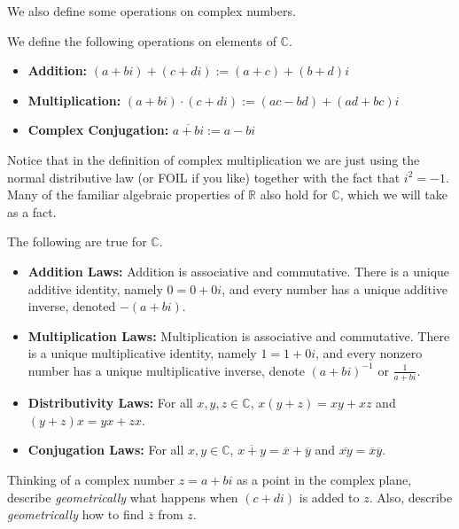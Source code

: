We also define some operations on complex numbers.

\begin{definition}
We define the following operations on elements of $\mathbb{C}$. 
\begin{itemize}
\item \textbf{Addition:} $(a+bi) + (c+di) := (a+c) + (b+d)i$
\item \textbf{Multiplication:} $(a+bi) \cdot (c+di) := (ac-bd) + (ad+bc)i$
\item \textbf{Complex Conjugation:} $\overline{a+bi} := a-bi$
\end{itemize}
\end{definition}

Notice that in the definition of complex multiplication we are just using the normal distributive law (or FOIL if you like) together with the fact that $i^2 = -1$. Many of the familiar algebraic properties of $\mathbb{R}$ also hold for $\mathbb{C}$, which we will take as a fact.

\begin{fact}\label{fact.ComplexLaws} The following are true for $\mathbb{C}$.
\begin{itemize}
\item \textbf{Addition Laws:} Addition is associative and commutative. There is a unique additive identity, namely $0 = 0 + 0i$, and every number has a unique additive inverse, denoted $-(a+bi)$.
\item \textbf{Multiplication Laws:} Multiplication is associative and commutative. There is a unique multiplicative identity, namely $1 = 1 + 0i$, and every nonzero number has a unique multiplicative inverse, denote $(a+bi)^{-1}$ or $\frac{1}{a+bi}$.
\item \textbf{Distributivity Laws:} For all $x,y,z \in \mathbb{C}$, $x(y+z) = xy+xz$ and $(y+z)x = yx+zx$.
\item \textbf{Conjugation Laws:} For all $x,y \in \mathbb{C}$, $\overline{x+y} = \overline{x} + \overline{y}$ and $\overline{xy} = \overline{x}\overline{y}$.
\end{itemize}
\end{fact}

\begin{problem}
Thinking of a complex number $z=a+bi$ as a point in the complex plane, describe \emph{geometrically} what happens when $(c+di)$ is added to $z$. Also, describe \emph{geometrically}  how to find $\overline{z}$ from $z$.
\end{problem}

